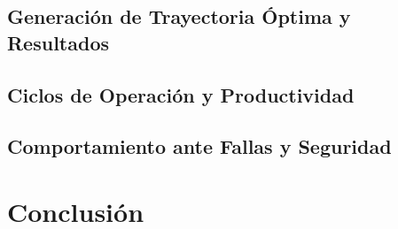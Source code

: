 \documentclass{article}
\begin{document}
            \subsection{Generación de Trayectoria Óptima y Resultados}
            
            \subsection{Ciclos de Operación y Productividad}
            
            \subsection{Comportamiento ante Fallas y Seguridad}
            



\section{Conclusión}\label{sec:conclusion}


%

%
\end{document}
